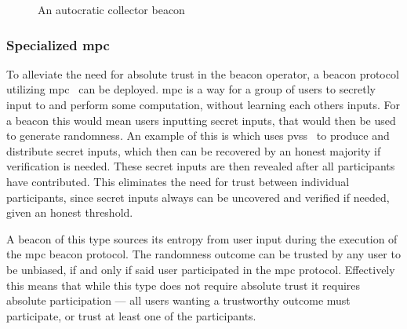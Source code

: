 \begin{figure*}[hbt]
    \centering
    \footnotesize
    \caption{An autocratic collector beacon}\label{fig:autocratic_beacon}
\end{figure*}

\subsubsection{Specialized \gls{mpc}}\label{ssub:specialized_mpc}
To alleviate the need for absolute trust in the beacon operator, a beacon protocol utilizing \acrfull{mpc}~\cite{goldreich1998secure} can be deployed. \gls{mpc} is a way for a group of users to secretly input to and perform some computation, without learning each others inputs.
For a beacon this would mean users inputting secret inputs, that would then be used to generate randomness.
An example of this is  which uses \gls{pvss}~\cite{stadler1996publicly} to produce and distribute secret inputs, which then can be recovered by an honest majority if verification is needed.
These secret inputs are then revealed after all participants have contributed.
This eliminates the need for trust between individual participants, since secret inputs always can be uncovered and verified if needed, given an honest threshold.

A beacon of this type sources its entropy from user input during the execution of the \gls{mpc} beacon protocol.
The randomness outcome can be trusted by any user to be unbiased, if and only if said user participated in the \gls{mpc} protocol.
Effectively this means that while this type does not require absolute trust it requires absolute participation --- all users wanting a trustworthy outcome must participate, or trust at least one of the participants.


